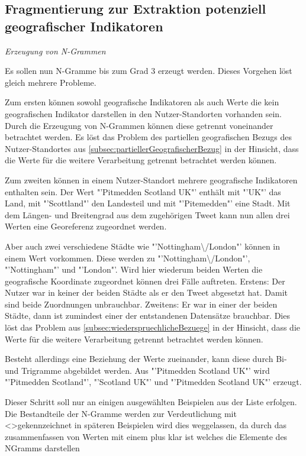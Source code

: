 		\subsection{Fragmentierung zur Extraktion potenziell geografischer Indikatoren} 

				\textit{Erzeugung von N-Grammen}

				Es sollen nun N-Gramme bis zum Grad 3 erzeugt werden. 
				Dieses Vorgehen löst gleich mehrere Probleme.

				Zum ersten können sowohl geografische Indikatoren als auch Werte die kein geografischen Indikator darstellen in den Nutzer-Standorten vorhanden sein.
				Durch die Erzeugung von N-Grammen können diese getrennt voneinander betrachtet werden.
				Es löst das Problem des partiellen geografischen Bezugs des Nutzer-Standortes aus \ref{subsec:partiellerGeografischerBezug} in der Hinsicht, dass die Werte für die weitere Verarbeitung getrennt betrachtet werden können.

				Zum zweiten können in einem Nutzer-Standort mehrere geografische Indikatoren enthalten sein.  
				Der Wert "'Pitmedden Scotland UK"' enthält mit "'UK"' das Land, mit "'Scottland"' den Landesteil und mit "'Pitemedden"' eine Stadt. 
				Mit dem Längen- und Breitengrad aus dem zugehörigen Tweet kann nun allen drei Werten eine Georeferenz zugeordnet werden.

				Aber auch zwei verschiedene Städte wie "'Nottingham\textbackslash/London"' können in einem Wert vorkommen.
				Diese werden zu "'Nottingham\textbackslash/London"', "'Nottingham"' und "'London"'.
				Wird hier wiederum beiden Werten die geografische Koordinate zugeordnet können drei Fälle auftreten.
				Erstens: Der Nutzer war in keiner der beiden Städte als er den Tweet abgesetzt hat. 
				Damit sind beide Zuordnungen unbrauchbar.
				Zweitens: Er war in einer der beiden Städte, dann ist zumindest einer der entstandenen Datensätze brauchbar.
				Dies löst das Problem aus \ref{subsec:wiederspruechlicheBezuege} in der Hinsicht, dass die Werte für die weitere Verarbeitung getrennt betrachtet werden können.

				Besteht allerdings eine Beziehung der Werte zueinander, kann diese durch Bi- und Trigramme abgebildet werden.
				Aus "'Pitmedden Scotland UK"' wird "'Pitmedden Scotland"', "'Scotland UK"' und "'Pitmedden Scotland UK"' erzeugt.

				Dieser Schritt soll nur an einigen ausgewählten Beispielen aus der Liste erfolgen.
				Die Bestandteile der N-Gramme werden zur Verdeutlichung mit \textless \textgreater gekennzeichnet in späteren Beispielen wird dies weggelassen, da durch das zusammenfassen von Werten mit einem plus klar ist welches die Elemente des NGramms darstellen

